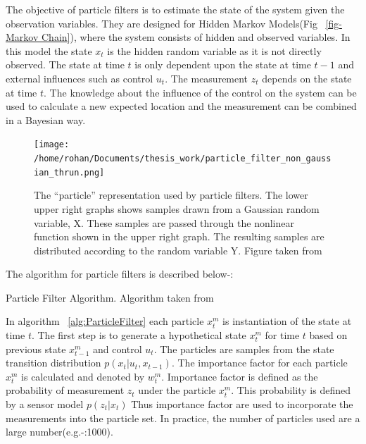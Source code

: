 \documentclass[12pt]{dalcsthesis}
\begin{document}
The objective of particle filters is to estimate the state of the system given the observation variables. They are designed for Hidden Markov Models(Fig ~\ref{fig-Markov Chain}), where the system consists of hidden and observed variables. In this model the state $x_{t}$ is the hidden random variable as it is not directly observed. The state at time $t$ is only dependent upon the state at time $t-1$ and external influences such as control $u_{t}$. The measurement $z_{t}$ depends on the state at time $t$. The knowledge about the influence of the control on the system can be used to calculate a new expected location and the measurement can be combined in a Bayesian way.


\begin{figure}
\centering
{\texttt{[image: /home/rohan/Documents/thesis\_work/particle\_filter\_non\_gaussian\_thrun.png]}}

\caption{\label{fig: particle representation} The ``particle'' representation used by particle filters. The lower upper right graphs shows samples drawn from a Gaussian random variable, X. These samples are passed through the nonlinear function shown in the upper right graph. The resulting samples are distributed according to the random variable Y. Figure taken from \cite{thrun2005probabilistic}}
\end{figure}

The algorithm for particle filters is described below-:

\begin{algorithm}[H]
\label{alg:ParticleFilter}
 \SetAlgoLined
  		 


\caption{Particle Filter Algorithm. Algorithm taken from \cite{thrun2005probabilistic}}
\end{algorithm}

In algorithm ~\ref{alg:ParticleFilter} each particle $x_{t}^{m}$ is instantiation of the state at time $t$.  The first step is to generate a hypothetical state $x_{t}^{m}$ for time $t$ based on previous state $x_{t-1}^{m}$ and control $u_{t}$. The particles are samples from the state transition distribution $p(x_{t}|u_{t},x_{t-1})$. The importance factor for each particle $x_{t}^{m}$ is calculated and denoted by $w_{t}^{m}$. Importance factor is defined as the probability of measurement $z_{t}$ under the particle $x_{t}^{m}$. This probability is defined by a sensor model $p(z_{t}|x_{t})$ Thus importance factor are used to incorporate the measurements into the particle set. In practice, the number of particles used are a large number(e.g.-:1000).
\end{document}
